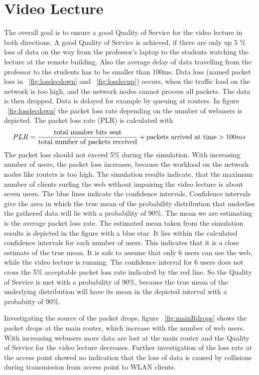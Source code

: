 \documentclass[a4paper,10pt]{book}\usepackage{graphicx}
\begin{document}
\section{Video Lecture}
The overall goal is to ensure a good Quality of Service for the video lecture in both directions.
A good Quality of Service is achieved, if there are only up 5 $\%$ loss of data
on the way from the professor's laptop to the students watching the lecture at the remote building. Also the average delay of data travelling from the professor to the students has to be smaller than 100ms.
Data loss (named packet loss in ~\ref{fig:losslecdown} and ~\ref{fig:losslecup}) occurs, when the traffic load on the network is too high, and the network nodes cannot process all packets.
The data is then dropped. Data is delayed for example by queuing at routers.
In figure  ~\ref{fig:losslecdown} the packet loss rate depending on the number of
webusers is depicted. The packet loss rate (PLR) is calculated with
\begin{equation}
 PLR=\frac{\textnormal{total number bits sent}}{\textnormal{total number of packets received}} + \textnormal{packets arrived at time} > 100ms
\end{equation}
The packet loss should not exceed 5$\%$ during the simulation.
With increasing number of users, the packet loss increases, because the 
workload on the network nodes like routers is too high.
The simulation results indicate, that the maximum number of clients surfing the 
web without impairing the video lecture is about seven users.
The blue lines indicate the confidence intervals. Confidence intervals give the area in which 
the true mean of the probability distribution that underlies the gathered data will lie with a probability of 90$\%$.
The mean we are estimating is the average packet loss rate. The estimated mean taken from the simulation results is depicted in the figure with a blue star.
It lies within the calculated confidence intervals for each number of users. This indicates that it is a close estimate of the true mean.
It is safe to assume that only 6 users can use the web, while the video lecture is running.
The confidence interval for 6 users does not cross the 5$\%$ acceptable packet loss 
rate indicated by the red line. So the Quality of Service is met with a probability of 90$\%$, because the true mean of the
underlying distribution will have its mean in the depicted interval with a probabiity of 90$\%$.


Investigating the source of the packet drops, figure ~\ref{fig:mainRdrops} shows the packet drops at the main router, which increase with the number of 
web users. With increasing webusers more data are lost at the main router and the Quality of Service for the video lecture decreases.
Further investigation of the loss rate at the access point showed no indication that 
the loss of data is caused by collisions during transmission from access point to WLAN clients.
\end{document}
